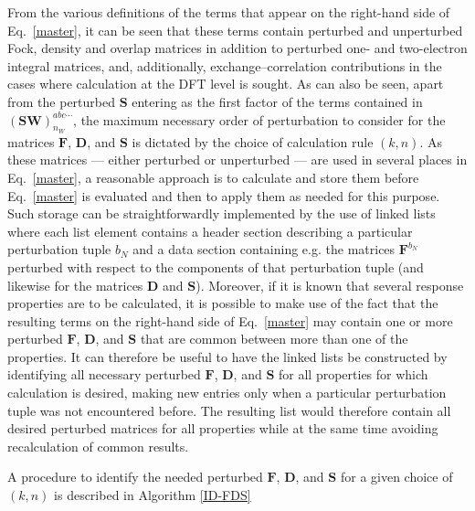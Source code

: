 \documentclass[%
 reprint,
 amsmath,amssymb,
 aps,
]{revtex4-1}
\begin{document}
From the various definitions of the terms that appear on the right-hand side of Eq.~\eqref{master}, it can be seen that these terms contain perturbed and unperturbed Fock, density and overlap matrices in addition to perturbed one- and two-electron integral matrices, and, additionally, exchange--correlation contributions in the cases where calculation at the DFT level is sought. As can also be seen, apart from the perturbed $\mathbf{S}$ entering as the first factor of the terms contained in $(\mathbf{SW})_{n_{W}}^{abc\cdots}$, the maximum necessary order of perturbation to consider for the matrices $\mathbf{F}$, $\mathbf{D}$, and $\mathbf{S}$ is dictated by the choice of calculation rule $(k, n)$. As these matrices --- either perturbed or unperturbed --- are used in several places in Eq.~\eqref{master}, a reasonable approach is to calculate and store them before Eq.~\eqref{master} is evaluated and then to apply them as needed for this purpose. Such storage can be straightforwardly implemented by the use of linked lists where each list element contains a header section describing a particular perturbation tuple $b_{N}$ and a data section containing e.g. the matrices $\mathbf{F}^{b_{N}}$ perturbed with respect to the components of that perturbation tuple (and likewise for the matrices $\mathbf{D}$ and $\mathbf{S}$). Moreover, if it is known that several response properties are to be calculated, it is possible to make use of the fact that the resulting terms on the right-hand side of Eq.~\eqref{master} may contain one or more perturbed $\mathbf{F}$, $\mathbf{D}$, and $\mathbf{S}$ that are common between more than one of the properties. It can therefore be useful to have the linked lists be constructed by identifying all necessary perturbed $\mathbf{F}$, $\mathbf{D}$, and $\mathbf{S}$ for all properties for which calculation is desired, making new entries only when a particular perturbation tuple was not encountered before. The resulting list would therefore contain all desired perturbed matrices for all properties while at the same time avoiding recalculation of common results.

A procedure to identify the needed perturbed $\mathbf{F}$, $\mathbf{D}$, and $\mathbf{S}$ for a given choice of $(k, n)$ is described in Algorithm \ref{ID-FDS} 
\end{document}
